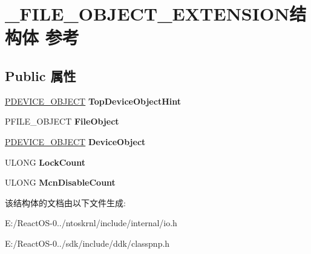 \hypertarget{struct___f_i_l_e___o_b_j_e_c_t___e_x_t_e_n_s_i_o_n}{}\section{\+\_\+\+F\+I\+L\+E\+\_\+\+O\+B\+J\+E\+C\+T\+\_\+\+E\+X\+T\+E\+N\+S\+I\+O\+N结构体 参考}
\label{struct___f_i_l_e___o_b_j_e_c_t___e_x_t_e_n_s_i_o_n}
\subsection*{Public 属性}
\begin{DoxyCompactItemize}
\item 
\mbox{\label{struct___f_i_l_e___o_b_j_e_c_t___e_x_t_e_n_s_i_o_n_a5893e636b058b5fffc63fb501935d9ea}} 
\hyperlink{struct___d_e_v_i_c_e___o_b_j_e_c_t}{P\+D\+E\+V\+I\+C\+E\+\_\+\+O\+B\+J\+E\+CT} {\bfseries Top\+Device\+Object\+Hint}
\item 
\mbox{\label{struct___f_i_l_e___o_b_j_e_c_t___e_x_t_e_n_s_i_o_n_ae43fbcceb4ae71d30e61f0c1a44e730f}} 
P\+F\+I\+L\+E\+\_\+\+O\+B\+J\+E\+CT {\bfseries File\+Object}
\item 
\mbox{\label{struct___f_i_l_e___o_b_j_e_c_t___e_x_t_e_n_s_i_o_n_a56e77621065028b7f3929cd7ffa809be}} 
\hyperlink{struct___d_e_v_i_c_e___o_b_j_e_c_t}{P\+D\+E\+V\+I\+C\+E\+\_\+\+O\+B\+J\+E\+CT} {\bfseries Device\+Object}
\item 
\mbox{\label{struct___f_i_l_e___o_b_j_e_c_t___e_x_t_e_n_s_i_o_n_af5ad8db1103f874954fd4e72e6606aa4}} 
U\+L\+O\+NG {\bfseries Lock\+Count}
\item 
\mbox{\label{struct___f_i_l_e___o_b_j_e_c_t___e_x_t_e_n_s_i_o_n_a0d64b92ea37d4290806250beaf62f1c2}} 
U\+L\+O\+NG {\bfseries Mcn\+Disable\+Count}
\end{DoxyCompactItemize}


该结构体的文档由以下文件生成\+:\begin{DoxyCompactItemize}
\item 
E\+:/\+React\+O\+S-\/0../ntoskrnl/include/internal/io.\+h\item 
E\+:/\+React\+O\+S-\/0../sdk/include/ddk/classpnp.\+h\end{DoxyCompactItemize}
